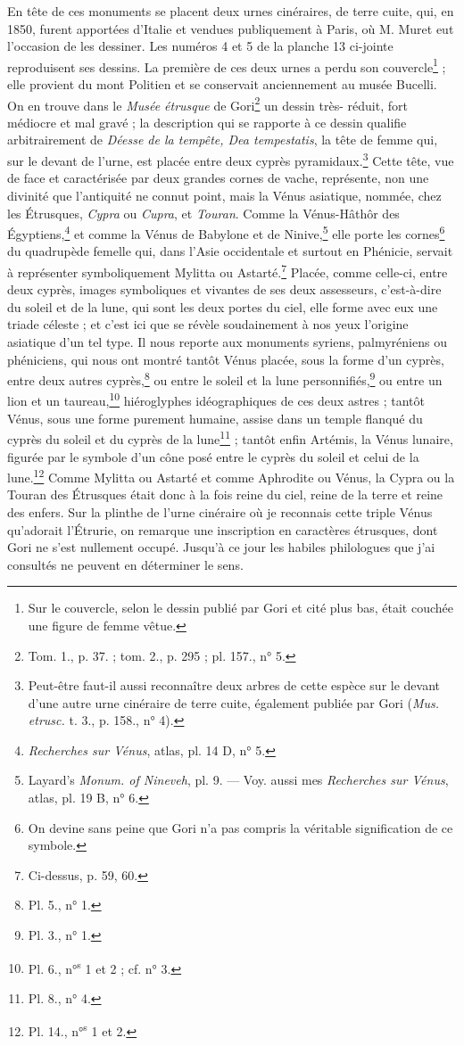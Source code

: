\documentclass{article}
\begin{document}
En tête de ces monuments se placent deux urnes cinéraires, de terre cuite, qui, en 1850, furent apportées d'Italie et vendues publiquement à Paris, où M. Muret eut l'occasion de les dessiner. Les numéros 4 et 5 de la planche 13 ci-jointe reproduisent ses dessins. La première de ces deux urnes a perdu son couvercle\footnote{Sur le couvercle, selon le dessin publié par Gori et cité plus bas, était couchée une figure de femme vêtue.} ; elle provient du mont Politien et se conservait anciennement au musée Bucelli. On en trouve dans le \emph{Musée étrusque} de Gori\footnote{Tom. 1., p. 37. ; tom. 2., p. 295 ; pl. 157., n° 5.} un dessin très- réduit, fort médiocre et mal gravé ; la description qui se rapporte à ce dessin qualifie arbitrairement de \emph{Déesse de la tempête, Dea tempestatis}, la tête de femme qui, sur le devant de l'urne, est placée entre deux cyprès pyramidaux.\footnote{Peut-être faut-il aussi reconnaître deux arbres de cette espèce sur le devant d'une autre urne cinéraire de terre cuite, également publiée par Gori (\emph{Mus. etrusc.} t. 3., p. 158., n° 4).} Cette tête, vue de face et caractérisée par deux grandes cornes de vache, représente, non une divinité que l'antiquité ne connut point, mais la Vénus asiatique, nommée, chez les Étrusques, \emph{Cypra} ou \emph{Cupra}, et \emph{Touran}. Comme la Vénus-Hâthôr des Égyptiens,\footnote{\emph{Recherches sur Vénus}, atlas, pl. 14 D, n° 5.} et comme la Vénus de Babylone et de Ninive,\footnote{Layard's \emph{Monum. of Nineveh}, pl. 9. --- Voy. aussi mes \emph{Recherches sur Vénus}, atlas, pl. 19 B, n° 6.} elle porte les cornes\footnote{On devine sans peine que Gori n'a pas compris la véritable signification de ce symbole.} du quadrupède femelle qui, dans l'Asie occidentale et surtout en Phénicie, servait à représenter symboliquement Mylitta ou Astarté.\footnote{Ci-dessus, p. 59, 60.} Placée, comme celle-ci, entre deux cyprès, images symboliques et vivantes de ses deux assesseurs, c'est-à-dire du soleil et de la lune, qui sont les deux portes du ciel, elle forme avec eux une triade céleste ; et c'est ici que se révèle soudainement à nos yeux l'origine asiatique d'un tel type. Il nous reporte aux monuments syriens, palmyréniens ou phéniciens, qui nous ont montré tantôt Vénus placée, sous la forme d'un cyprès, entre deux autres cyprès,\footnote{Pl. 5., n° 1.} ou entre le soleil et la lune personnifiés,\footnote{Pl. 3., n° 1.} ou entre un lion et un taureau,\footnote{Pl. 6., n°\textsuperscript{s} 1 et 2 ; cf. n° 3.} hiéroglyphes idéographiques de ces deux astres ; tantôt Vénus, sous une forme purement humaine, assise dans un temple flanqué du cyprès du soleil et du cyprès de la lune\footnote{Pl. 8., n° 4.} ; tantôt enfin Artémis, la Vénus lunaire, figurée par le symbole d'un cône posé entre le cyprès du soleil et celui de la lune.\footnote{Pl. 14., n°\textsuperscript{s} 1 et 2.} Comme Mylitta ou Astarté et comme Aphrodite ou Vénus, la Cypra ou la Touran des Étrusques était donc à la fois reine du ciel, reine de la terre et reine des enfers. Sur la plinthe de l'urne cinéraire où je reconnais cette triple Vénus qu'adorait l'Étrurie, on remarque une inscription en caractères étrusques, dont Gori ne s'est nullement occupé. Jusqu'à ce jour les habiles philologues que j'ai consultés ne peuvent en déterminer le sens.
\end{document}
